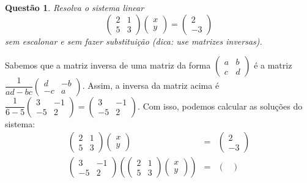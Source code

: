 \documentclass[a4paper,12pt]{article}
\newenvironment{sol}{\begin{tcolorbox}[breakable,colback=blue!5!white,colframe=blue!40!white,title=\normalsize {\sc{Solução}},coltitle=black]}{\end{tcolorbox}}
\newtheorem{qst}{Questão}
\begin{document}
\begin{qst}
	Resolva o sistema linear
	\[\begin{pmatrix}
	2&1\\5&3
	\end{pmatrix}\begin{pmatrix}
	x\\y
	\end{pmatrix}=\begin{pmatrix}
	2\\-3
	\end{pmatrix}\]sem escalonar e sem fazer substituição (dica: use matrizes inversas).
\end{qst}
\begin{sol}
	Sabemos que a matriz inversa de uma matriz da forma $\begin{pmatrix}
	a&b\\c&d
	\end{pmatrix}$ é a matriz $\dfrac{1}{ad-bc}\begin{pmatrix}
	d&-b\\-c&a
	\end{pmatrix}$. Assim, a inversa da matriz acima é $\dfrac{1}{6-5}\begin{pmatrix}
	3&-1\\-5&2
	\end{pmatrix}=\begin{pmatrix}
	3&-1\\-5&2
	\end{pmatrix}$. Com isso, podemos calcular as soluções do sistema:
	\[\begin{array}{rcl}
	\begin{pmatrix}
	2&1\\5&3
	\end{pmatrix}\begin{pmatrix}
	x\\y
	\end{pmatrix}&=&\begin{pmatrix}
	2\\-3
	\end{pmatrix}\\
	\begin{pmatrix}
	3&-1\\-5&2
	\end{pmatrix}\left(\begin{pmatrix}
	2&1\\5&3
	\end{pmatrix}\begin{pmatrix}
	x\\y
	\end{pmatrix}\right)&=&\begin{pmatrix}

\end{pmatrix}
\end{array}\]
\end{sol}
\end{document}

